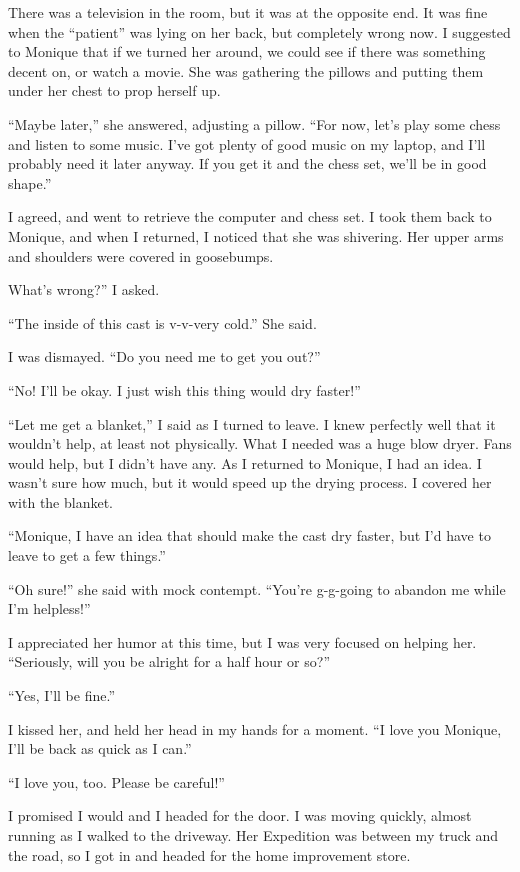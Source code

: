 There was a television in the room, but it was at the opposite end. It was fine when the
``patient'' was lying on her back, but completely wrong now. I suggested to Monique that if we
turned her around, we could see if there was something decent on, or watch a movie. She was
gathering the pillows and putting them under her chest to prop herself up.

``Maybe later,'' she answered, adjusting a pillow. ``For now, let's play some chess and listen
to some music. I've got plenty of good music on my laptop, and I'll probably need it later
anyway. If you get it and the chess set, we'll be in good shape.''

I agreed, and went to retrieve the computer and chess set. I took them back to Monique, and
when I returned, I noticed that she was shivering. Her upper arms and shoulders were covered in
goosebumps.

What's wrong?'' I asked.

``The inside of this cast is v-v-very cold.'' She said.

I was dismayed. ``Do you need me to get you out?''

``No! I'll be okay. I just wish this thing would dry faster!''

``Let me get a blanket,'' I said as I turned to leave. I knew perfectly well that it wouldn't
help, at least not physically. What I needed was a huge blow dryer. Fans would help, but I
didn't have any. As I returned to Monique, I had an idea. I wasn't sure how much, but it would
speed up the drying process. I covered her with the blanket.

``Monique, I have an idea that should make the cast dry faster, but I'd have to leave to get
a few things.''

``Oh sure!'' she said with mock contempt. ``You're g-g-going to abandon me while I'm
helpless!''

I appreciated her humor at this time, but I was very focused on helping her. ``Seriously,
will you be alright for a half hour or so?''

``Yes, I'll be fine.''

I kissed her, and held her head in my hands for a moment. ``I love you Monique, I'll be back
as quick as I can.''

``I love you, too. Please be careful!''

I promised I would and I headed for the door. I was moving quickly, almost running as I
walked to the driveway. Her Expedition was between my truck and the road, so I got in and headed
for the home improvement store.

